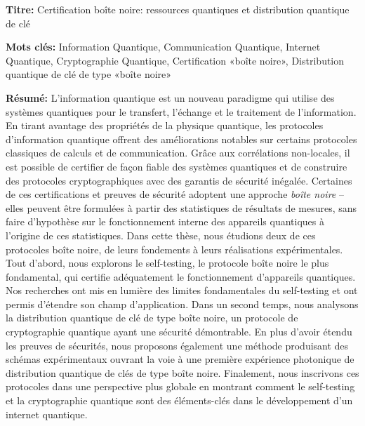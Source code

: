 \documentclass[french,12pt,a4paper]{book}
\begin{document}
\vspace{2mm}

\begin{mdframed}[linecolor=Prune,linewidth=1]
	
	\textbf{Titre:} Certification \guillemotleft bo\^ite noire\guillemotright: ressources quantiques et distribution quantique de clé 

	\noindent \textbf{Mots clés:} Information Quantique, Communication Quantique, Internet Quantique, Cryptographie Quantique, Certification «boîte noire», Distribution quantique de clé de type «boîte noire»

	\vspace{-.5cm}
	\begin{multicols}{2}
		\noindent \textbf{Résumé:}
		L'information quantique est un nouveau paradigme qui utilise des systèmes quantiques pour le transfert, l'échange et le traitement de l'information.
		En tirant avantage des propriétés de la physique quantique, les protocoles d'information quantique offrent des améliorations notables sur certains protocoles classiques de calculs et de communication.
		Grâce aux corrélations non-locales, il est possible de certifier de façon fiable des systèmes quantiques et de construire des protocoles cryptographiques avec des garantis de sécurité inégalée.
		Certaines de ces certifications et preuves de sécurité adoptent une approche \textit{boîte noire} -- elles peuvent être formulées à partir des statistiques de résultats de mesures, sans faire d'hypothèse sur le fonctionnement interne des appareils quantiques à l'origine de ces statistiques.
		Dans cette thèse, nous étudions deux de ces protocoles boîte noire, de leurs fondements à leurs réalisations expérimentales.
		Tout d'abord, nous explorons le self-testing, le protocole boîte noire le plus fondamental, qui certifie adéquatement le fonctionnement d'appareils quantiques.
		Nos recherches ont mis en lumière des limites fondamentales du self-testing et ont permis d'étendre son champ d'application. 
		Dans un second temps, nous analysons la distribution quantique de clé de type boîte noire, un protocole de cryptographie quantique ayant une sécurité démontrable.
		En plus d'avoir étendu les preuves de sécurités, nous proposons également une méthode produisant des schémas expérimentaux ouvrant la voie à une première expérience photonique de distribution quantique de clés de type boîte noire.    
		Finalement, nous inscrivons ces protocoles dans une perspective plus globale en montrant comment le self-testing et la cryptographie quantique sont des éléments-clés dans le développement d'un internet quantique.
	\end{multicols}
\end{mdframed}
\end{document}
